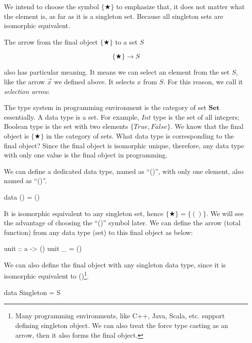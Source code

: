 \documentclass[b5paper]{article}
\begin{document}
\begin{example}
We intend to choose the symbol $\{ \bigstar \}$ to emphasize that, it does not matter what the element is, as far as it is a singleton set. Because all singleton sets are isomorphic equivalent.

\label{sec:selection-arrow} 
The arrow from the final object $\{ \bigstar \}$ to a set $S$

\[
  \{ \bigstar \} \longrightarrow S
\]

also has particular meaning. It means we can select an element from the set $S$, like the arrow $\vec{x}$ we defined above. It selects $x$ from $S$. For this reason, we call it {\em selection arrow}.
\end{example}

\begin{example}
\normalfont

The type system in programming environment is the category of set $\pmb{Set}$ essentially. A data type is a set. For example, $Int$ type is the set of all integers; Boolean type is the set with two elements $\{True, False\}$. We know that the final object is $\{ \bigstar \}$ in the category of sets. What data type is corresponding to the final object? Since the final object is isomorphic unique, therefore, any data type with only one value is the final object in programming.

We can define a dedicated data type, named as ``()'', with only one element, also named as ``()''.

\begin{Haskell}
data  ()  =  ()
\end{Haskell}

It is isomorphic equivalent to any singleton set, hence $\{ \bigstar \} = \{()\}$. We will see the advantage of choosing the ``()'' symbol later. We can define the arrow (total function) from any data type (set) to this final object as below:

\begin{Haskell}
unit :: a -> ()
unit _ = ()
\end{Haskell}

We can also define the final object with any singleton data type, since it is isomorphic equivalent to ()\footnote{Many programming environments, like C++, Java, Scala, etc. support defining singleton object. We can also treat the force type casting as an arrow, then it also forms the final object.}.

\begin{Haskell}
data Singleton = S


\end{Haskell}
\end{example}
\end{document}
